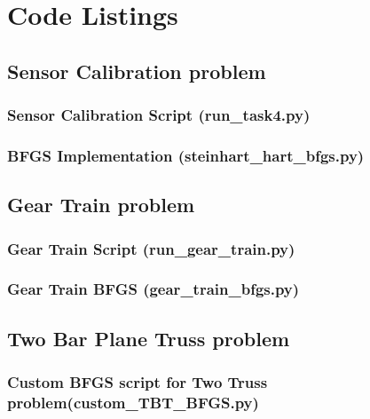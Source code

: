 \clearpage
\appendix
\section{Code Listings}

\subsection{Sensor Calibration problem}
\subsubsection{Sensor Calibration Script (run\_task4.py)}


\subsubsection{BFGS Implementation (steinhart\_hart\_bfgs.py)}


\subsection{Gear Train problem}
\subsubsection{Gear Train Script (run\_gear\_train.py)}


\subsubsection{Gear Train BFGS (gear\_train\_bfgs.py)}


\subsection{Two Bar Plane Truss problem}
\subsubsection{Custom BFGS script for Two Truss problem(custom\_TBT\_BFGS.py)}



